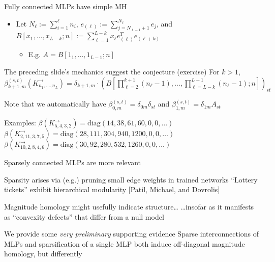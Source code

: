 \documentclass[usenames,dvipsnames,10pt,aspectratio=169]{beamer}
\begin{document}
\begin{frame}{Fully connected MLPs have simple MH}

\begin{itemize}
	\item Let $N_\ell := \sum_{i = 1}^{\ell} n_i$, $e_{(\ell)} := \sum_{j=N_{\ell-1}+1}^{N_\ell} e_j$, and $B[x_1,\dots,x_{L-k};n] := \sum_{\ell=1}^{L-k} x_\ell e_{(\ell)}^T e_{(\ell+k)}$
	\begin{itemize}
		\item E.g. $A = B[1_1,\dots,1_{L-1};n]$
	\end{itemize}
\end{itemize}

\begin{alertblock}{The preceding slide's mechanics suggest the conjecture (exercise)}
For $k > 1$, $\beta_{k+1,m}^{(s,t)}(K^\rightarrow_{n_1,\dots,n_L}) = \delta_{k+1,m} \cdot \left ( B \left [ \prod_{\ell = 2}^{k+1} (n_\ell-1), \dots, \prod_{\ell = L-k}^{L-1} (n_\ell-1) ; n \right ] \right )_{st}$ 
\end{alertblock}

Note that we automatically have $\beta_{0,m}^{(s,t)} = \delta_{0m} \delta_{st}$ and $\beta_{1,m}^{(s,t)} = \delta_{1m} A_{st}$

\begin{block}{Examples:}
$\beta(K^\rightarrow_{5,4,3,2}) = \text{diag}(14,38,61,60,0,0,\dots)$ \\
$\beta(K^\rightarrow_{2,11,3,7,5}) = \text{diag}(28,111,304,940,1200,0,0,\dots)$ \\
$\beta(K^\rightarrow_{10,2,8,4,6}) = \text{diag}(30,92,280,532,1260,0,0,\dots)$
\end{block}
\end{frame}


\begin{frame}{Sparsely connected MLPs are more relevant}

\begin{block}{Sparsity arises via (e.g.) pruning small edge weights in trained networks}
``Lottery tickets'' exhibit hierarchical modularity [Patil, Michael, and Dovrolis]
\end{block}

\begin{alertblock}{Magnitude homology might usefully indicate structure\dots}
\dots insofar as it manifests as ``convexity defects'' that differ from a null model
\end{alertblock}

\begin{block}{We provide some \emph{very preliminary} supporting evidence}
Sparse interconnections of MLPs and sparsification of a single MLP both induce off-diagonal magnitude homology, but differently
\end{block}
\end{frame}
\end{document}
